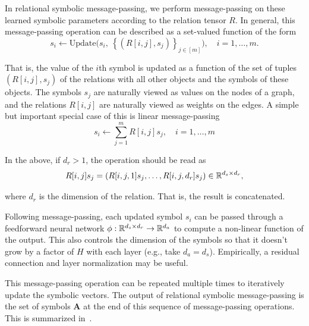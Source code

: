 In relational symbolic message-passing, we perform message-passing on these learned symbolic parameters according to the relation tensor $R$. In general, this message-passing operation can be described as a set-valued function of the form
\begin{equation}
    \label{eq:symbolic_message_passing}
    s_i \leftarrow \text{Update}\Big( s_i, \ \left\{ \left(R[i,j], s_j\right)\right\}_{j\in[m]}\Big), \quad i = 1, \ldots, m.
\end{equation}

That is, the value of the $i$th symbol is updated as a function of the set of tuples $(R[i,j], s_j)$ of the relations with all other objects and the symbols of these objects. The symbols $s_j$ are naturally viewed as values on the nodes of a graph, and the relations $R[i,j]$ are naturally viewed as weights on the edges. A simple but important special case of this is linear message-passing
\begin{equation}
    \label{eq:linear_symbolic_mp}
    s_i \leftarrow \sum_{j=1}^{m} R[i,j] s_j, \quad i=1, \ldots, m
\end{equation}

In the above, if $d_r > 1$, the operation should be read as
\begin{equation*}
    R[i,j] s_j = \left( R[i,j,1] s_j, \ldots, R[i,j, d_r] s_j \right) \in \reals^{d_s \times d_r},
\end{equation*}

where $d_r$ is the dimension of the relation. That is, the result is concatenated.

Following message-passing, each updated symbol $s_i$ can be passed through a feedforward neural network $\phi: \mathbb{R}^{d_s \times d_r} \rightarrow \mathbb{R}^{d_a}$ to compute a non-linear function of the output. This also controls the dimension of the symbols so that it doesn't grow by a factor of $H$ with each layer (e.g., take $d_a = d_s$). Empirically, a residual connection and layer normalization may be useful.

This message-passing operation can be repeated multiple times to iteratively update the symbolic vectors.  The output of relational symbolic message-passing is the set of symbols $\bm{A}$ at the end of this sequence of message-passing operations. This is summarized in~.

